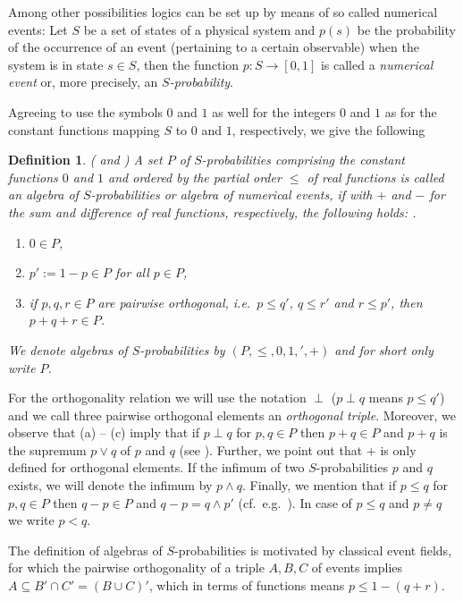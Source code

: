 \documentclass[12pt]{article}
\newtheorem{definition}[theorem]{Definition}
\begin{document}
Among other possibilities logics can be set up by means of so called numerical events: Let $S$ be a set of states of a physical system and $p(s)$ be the probability of the occurrence of an event (pertaining to a certain observable) when the system is in state $s\in S$, then the function $p\colon S\to[0,1]$ is called a {\em numerical event} or, more precisely, an {\em $S$-probability}.

Agreeing to use the symbols $0$ and $1$ as well for the integers $0$ and $1$ as for the constant functions mapping $S$ to $0$ and $1$, respectively, we give the following 

\begin{definition}\label{def1}
{\rm(\cite{BM91}} and {\rm\cite{BM93})} A set $P$ of $S$-probabilities comprising the constant functions $0$ and $1$ and ordered by the partial order $\le$ of real functions is called an {\em algebra of $S$-probabilities} or {\em algebra of numerical events}, if with $+$ and $-$ for the sum and difference of real functions, respectively, the following holds:   .
\begin{enumerate}
\item[{\rm(a)}] $0\in P$,
\item[{\rm(b)}] $p':=1-p\in P$ for all $p\in P$,
\item[{\rm(c)}] if $p,q,r\in P$ are pairwise orthogonal, i.e.\ $p\le q'$, $q\le r'$ and $r\le p'$, then $p+q+r\in P$.
\end{enumerate}
We denote algebras of $S$-probabilities by $(P,\le,0,1,{}',+)$ and for short only write $P$.
\end{definition}

For the orthogonality relation we will use the notation $\perp$ ($p\perp q$ means $p\leq q'$) and we call three pairwise orthogonal elements an {\em orthogonal triple}. Moreover, we observe that (a) -- (c) imply that if $p\perp q$ for $p,q\in P$ then $p+q\in P$ and $p+q$ is the supremum $p\vee q$ of $p$ and $q$ (see \cite{MT}). Further, we point out that $+$ is only defined for orthogonal elements. If the infimum of two $S$-probabilities $p$ and $q$ exists, we will denote the infimum by $p\wedge q$. Finally, we mention that if $p\le q$ for $p,q\in P$ then $q-p\in P$ and $q-p=q\wedge p'$ (cf.\ e.g.\ \cite{DDL}). In case of $p\le q$ and $p\ne q$ we write $p<q$.

The definition of algebras of $S$-probabilities is motivated by classical event fields, for which the pairwise orthogonality of a triple $A,B,C$ of events implies $A\subseteq B'\cap C'=(B\cup C)'$, which in terms of functions means $p\le1-(q+r)$.
\end{document}
